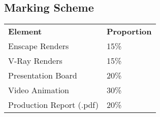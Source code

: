 \subsection*{Marking Scheme}

\begin{table}[h!]
	\begin{center}
		\begin{tabular}{p{5cm}  p{5cm} }
			\toprule
			\textbf{Element} & \textbf{Proportion} \\ 
			\cmidrule(r){1-1}\cmidrule(lr){2-2}
			Enscape Renders & 15\%\\
			V-Ray Renders & 15\%\\
			Presentation Board & 20\%\\
			Video Animation & 30\%\\
			Production Report (.pdf) & 20\%
			\\ \bottomrule
		\end{tabular}
		\label{tbl:markSchemeAsmt3}
	\end{center}
\end{table}




